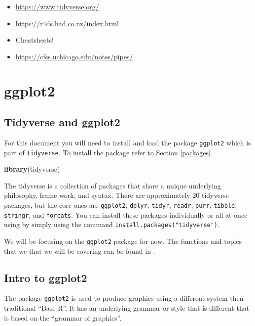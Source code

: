 \documentclass[
]{book}
\newenvironment{Shaded}{\begin{snugshade}}{\end{snugshade}}
\newcommand{\KeywordTok}[1]{\textcolor[rgb]{0.13,0.29,0.53}{\textbf{#1}}}
\newcommand{\NormalTok}[1]{#1}
\begin{document}
\begin{itemize}
\item
  \url{https://www.tidyverse.org/}
\item
  \url{https://r4ds.had.co.nz/index.html}
\item
  Cheatsheets!
\item
  \url{https://cfss.uchicago.edu/notes/pipes/}
\end{itemize}

\hypertarget{ggplot2}{%
\chapter{ggplot2}\label{ggplot2}}

\hypertarget{tidyverse-and-ggplot2}{%
\section{Tidyverse and ggplot2}\label{tidyverse-and-ggplot2}}

For this document you will need to install and load the package \texttt{ggplot2} which is part of \texttt{tidyverse}. To install the package refer to Section \ref{packages}.

\begin{Shaded}
\begin{Highlighting}[]
\KeywordTok{library}\NormalTok{(tidyverse)}
\end{Highlighting}
\end{Shaded}

The tidyverse is a collection of packages that share a unique underlying philosophy, frame work, and syntax. There are approximately 20 tidyverse packages, but the core ones are \texttt{ggplot2}, \texttt{dplyr}, \texttt{tidyr}, \texttt{readr}, \texttt{purr}, \texttt{tibble}, \texttt{stringr}, and \texttt{forcats}. You can install these packages individually or all at once using by simply using the command \texttt{install.packages("tidyverse")}.

We will be focusing on the \texttt{ggplot2} package for now. The functions and topics that we that we will be covering can be found in \citet{wickham2009elegant}.

\hypertarget{intro-to-ggplot2}{%
\section{Intro to ggplot2}\label{intro-to-ggplot2}}

The package \texttt{ggplot2} is used to produce graphics using a different system then traditional ``Base R''. It has an underlying grammar or style that is different that is based on the ``grammar of graphics''.
\end{document}
